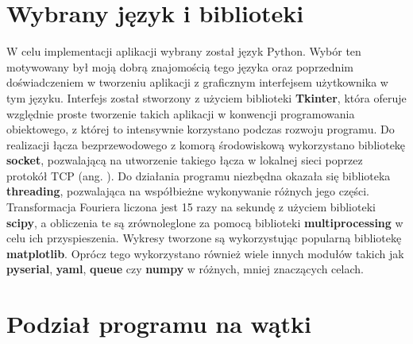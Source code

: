 \section{Wybrany język i biblioteki} \label{aplikacja_implementacja}

W celu implementacji aplikacji wybrany został język Python. Wybór ten motywowany był moją dobrą znajomością tego języka oraz poprzednim doświadczeniem w tworzeniu aplikacji z graficznym interfejsem użytkownika w tym języku. Interfejs został stworzony z użyciem biblioteki \textbf{Tkinter}, która oferuje względnie proste tworzenie takich aplikacji w konwencji programowania obiektowego, z której to intensywnie korzystano podczas rozwoju programu. Do realizacji łącza bezprzewodowego z komorą środowiskową wykorzystano bibliotekę \textbf{socket}, pozwalającą na utworzenie takiego łącza w lokalnej sieci poprzez protokół TCP (ang. ). Do działania programu niezbędna okazała się biblioteka \textbf{threading}, pozwalająca na współbieżne wykonywanie różnych jego części. Transformacja Fouriera liczona jest 15 razy na sekundę z użyciem biblioteki \textbf{scipy}, a obliczenia te są zrównoleglone za pomocą biblioteki \textbf{multiprocessing} w celu ich przyspieszenia. Wykresy tworzone są wykorzystując popularną bibliotekę \textbf{matplotlib}. Oprócz tego wykorzystano również wiele innych modułów takich jak \textbf{pyserial}, \textbf{yaml}, \textbf{queue} czy \textbf{numpy} w różnych, mniej znaczących celach.

\section{Podział programu na wątki} \label{watki}

